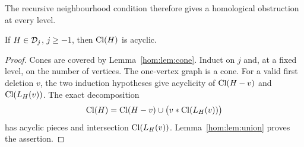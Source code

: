 The recursive neighbourhood condition therefore gives a homological obstruction at every level.

\begin{lemma}\label{hom:lem:acyclic}
If \(H\in\mathcal D_j\), \(j\geq-1\), then \(\operatorname{Cl}(H)\) is acyclic.
\end{lemma}
\begin{proof}
Cones are covered by Lemma~\ref{hom:lem:cone}. Induct on \(j\) and,
at a fixed level, on the number of vertices. The one-vertex graph
is a cone. For a valid first deletion \(v\), the two induction
hypotheses give acyclicity of \(\operatorname{Cl}(H-v)\) and \(\operatorname{Cl}(L_H(v))\).
The exact decomposition
\[
 \operatorname{Cl}(H)=\operatorname{Cl}(H-v)\cup\bigl(v*\operatorname{Cl}(L_H(v))\bigr)
\]
has acyclic pieces and intersection \(\operatorname{Cl}(L_H(v))\).
Lemma~\ref{hom:lem:union} proves the assertion.
\end{proof}

